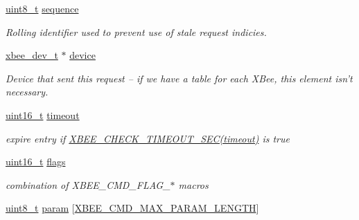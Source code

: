 \begin{DoxyCompactItemize}
\item 
\hyperlink{group__hal_gae1affc9ca37cfb624959c866a73f83c2}{uint8\-\_\-t} \hyperlink{structxbee__cmd__request__t_acb5c8866a58116314f6c8eda9dc3544c}{sequence}
\begin{DoxyCompactList}\small\item\em Rolling identifier used to prevent use of stale request indicies. \end{DoxyCompactList}\item 
\hyperlink{structxbee__dev__t}{xbee\-\_\-dev\-\_\-t} $\ast$ \hyperlink{structxbee__cmd__request__t_ac780e07a2b2cd8df18f56240588090c5}{device}
\begin{DoxyCompactList}\small\item\em Device that sent this request -- if we have a table for each X\-Bee, this element isn't necessary. \end{DoxyCompactList}\item 
\hypertarget{structxbee__cmd__request__t_a7f1ad43d3bf79b40bc39dbb5a6c3a5ae}{\hyperlink{group__hal_ga5a8b2dc9e45a9ee81a94ef304fb62505}{uint16\-\_\-t} \hyperlink{structxbee__cmd__request__t_a7f1ad43d3bf79b40bc39dbb5a6c3a5ae}{timeout}}\label{structxbee__cmd__request__t_a7f1ad43d3bf79b40bc39dbb5a6c3a5ae}

\begin{DoxyCompactList}\small\item\em expire entry if \hyperlink{group__hal_ga858c3c1caa899efd6af9ee8a0fe09246}{X\-B\-E\-E\-\_\-\-C\-H\-E\-C\-K\-\_\-\-T\-I\-M\-E\-O\-U\-T\-\_\-\-S\-E\-C(timeout)} is true \end{DoxyCompactList}\item 
\hypertarget{structxbee__cmd__request__t_a1e87af3c18a2fd36c61faf89949bdc3f}{\hyperlink{group__hal_ga5a8b2dc9e45a9ee81a94ef304fb62505}{uint16\-\_\-t} \hyperlink{structxbee__cmd__request__t_a1e87af3c18a2fd36c61faf89949bdc3f}{flags}}\label{structxbee__cmd__request__t_a1e87af3c18a2fd36c61faf89949bdc3f}

\begin{DoxyCompactList}\small\item\em combination of X\-B\-E\-E\-\_\-\-C\-M\-D\-\_\-\-F\-L\-A\-G\-\_\-$\ast$ macros \end{DoxyCompactList}\item 
\hypertarget{structxbee__cmd__request__t_a4dd3f2f91ad35819bbed1f14b2b2ad13}{\hyperlink{group__hal_gae1affc9ca37cfb624959c866a73f83c2}{uint8\-\_\-t} \hyperlink{structxbee__cmd__request__t_a4dd3f2f91ad35819bbed1f14b2b2ad13}{param} \mbox{[}\hyperlink{group__xbee__atcmd_ga9b1046f9c200c1bb0a9b57cb0ec474df}{X\-B\-E\-E\-\_\-\-C\-M\-D\-\_\-\-M\-A\-X\-\_\-\-P\-A\-R\-A\-M\-\_\-\-L\-E\-N\-G\-T\-H}\mbox{]}}\label{structxbee__cmd__request__t_a4dd3f2f91ad35819bbed1f14b2b2ad13}


\end{DoxyCompactItemize}

